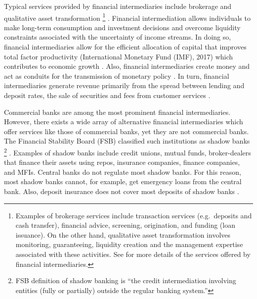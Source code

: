 \documentclass[a4paper, nobind]{templates/ociamthesis}
\begin{document}
Typical services provided by financial intermediaries include brokerage and qualitative asset transformation \footnote{Examples of brokerage services include transaction services (e.g.~deposits and cash transfer), financial advice, screening, origination, and funding (loan issuance). On the other hand, qualitative asset transformation involves monitoring, guaranteeing, liquidity creation and the management expertise associated with these activities. See \textcite{greenbaum2019contemporary} for more details of the services offered by financial intermediaries.} \autocite{greenbaum2019contemporary,gobat2017banksmatter}. Financial intermediation allows individuals to make long-term consumption and investment decisions and overcome liquidity constraints associated with the uncertainty of income streams\autocite{greenbaum2019contemporary}. In doing so, financial intermediaries allow for the efficient allocation of capital that improves total factor productivity (International Monetary Fund (IMF), 2017) which contributes to economic growth \autocite{chen2017microfinance}. Also, financial intermediaries create money and act as conduits for the transmission of monetary policy \autocite{greenbaum2019contemporary}. In turn, financial intermediaries generate revenue primarily from the spread between lending and deposit rates, the sale of securities and fees from customer services \autocite{cosci2015role}.

Commercial banks are among the most prominent financial intermediaries. However, there exists a wide array of alternative financial intermediaries which offer services like those of commercial banks, yet they are not commercial banks. The Financial Stability Board (FSB) classified such institutions as shadow banks \footnote{FSB definition of shadow banking is ``the credit intermediation involving entities (fully or partially) outside the regular banking system.''} \autocite{board2017assessment} . Examples of shadow banks include credit unions, mutual funds, broker-dealers that finance their assets using repos, insurance companies, finance companies, and MFIs. Central banks do not regulate most shadow banks. For this reason, most shadow banks cannot, for example, get emergency loans from the central bank. Also, deposit insurance does not cover most deposits of shadow banks \autocite{kodres2017shadowbanking}.
\end{document}
